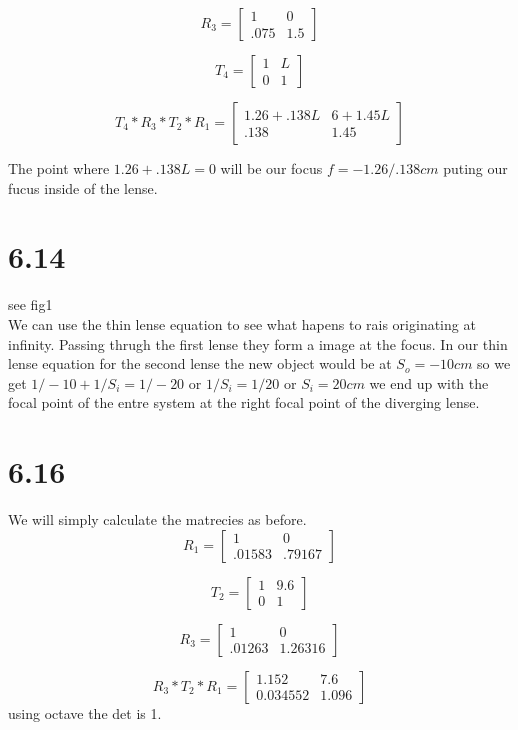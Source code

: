 \documentclass[12pt,a4paper]{article}
\begin{document}
$$
R_3=
\begin{bmatrix}
1&   0\\
.075 &  1.5
\end{bmatrix}$$

$$
T_4=
\begin{bmatrix}
1 & L\\
0 & 1
\end{bmatrix}$$

$$
T_4*R_3*T_2*R_1=
\begin{bmatrix}
1.26+.138L&6+1.45L\\
.138&1.45
\end{bmatrix}$$

The point where $1.26+.138L=0$ will be our focus $f=-1.26/.138cm$ puting our fucus inside of the lense.

\section{6.14}
see fig1\\
We can use the thin lense equation to see what hapens to rais originating at infinity.  Passing thrugh the first lense they form a image at the focus.  In our thin lense equation for the second lense the new object would be at $S_o=-10cm$ so we get $1/-10+1/S_i=1/-20$ or $1/S_i=1/20$ or $S_i=20cm$ we end up with the focal point of the entre system at the right focal point of the diverging lense.

\section{6.16}
We will simply calculate the matrecies as before.
$$
R_1=
\begin{bmatrix}
1&   0\\
.01583 &  .79167
\end{bmatrix}$$

$$
T_2=
\begin{bmatrix}
1&   9.6\\
0 &  1
\end{bmatrix}$$

$$
R_3=
\begin{bmatrix}
1&   0\\
.01263 &  1.26316
\end{bmatrix}$$

$$
R_3*T_2*R_1=
\begin{bmatrix}
1.152&   7.6\\
0.034552&   1.096
\end{bmatrix}$$
using octave the det is 1.
\end{document}
